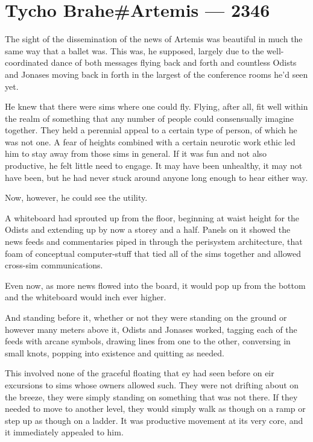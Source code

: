 \hypertarget{tycho-braheartemis-2346}{%
\chapter{Tycho Brahe\#Artemis — 2346}\label{tycho-braheartemis-2346}}

The sight of the dissemination of the news of Artemis was beautiful in much the same way that a ballet was. This was, he supposed, largely due to the well-coordinated dance of both messages flying back and forth and countless Odists and Jonases moving back in forth in the largest of the conference rooms he'd seen yet.

He knew that there were sims where one could fly. Flying, after all, fit well within the realm of something that any number of people could consensually imagine together. They held a perennial appeal to a certain type of person, of which he was not one. A fear of heights combined with a certain neurotic work ethic led him to stay away from those sims in general. If it was fun and not also productive, he felt little need to engage. It may have been unhealthy, it may not have been, but he had never stuck around anyone long enough to hear either way.

Now, however, he could see the utility.

A whiteboard had sprouted up from the floor, beginning at waist height for the Odists and extending up by now a storey and a half. Panels on it showed the news feeds and commentaries piped in through the perisystem architecture, that foam of conceptual computer-stuff that tied all of the sims together and allowed cross-sim communications.

Even now, as more news flowed into the board, it would pop up from the bottom and the whiteboard would inch ever higher.

And standing before it, whether or not they were standing on the ground or however many meters above it, Odists and Jonases worked, tagging each of the feeds with arcane symbols, drawing lines from one to the other, conversing in small knots, popping into existence and quitting as needed.

This involved none of the graceful floating that ey had seen before on eir excursions to sims whose owners allowed such. They were not drifting about on the breeze, they were simply standing on something that was not there. If they needed to move to another level, they would simply walk as though on a ramp or step up as though on a ladder. It was productive movement at its very core, and it immediately appealed to him.

